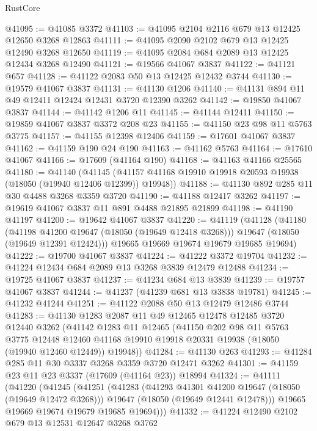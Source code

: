 \begin{lexlean}{RustCore}
\begin{coremodule}
@41095 := @41085 @3372
@41103 := @41095 @2104 @2116 @679 @13 @12425 @12650 @3268 @12863
@41111 := @41095 @2090 @2102 @679 @13 @12425 @12490 @3268 @12650
@41119 := @41095 @2084 @684 @2089 @13 @12425 @12434 @3268 @12490
@41121 := @19566 @41067 @3837
@41122 := @41121 @657
@41128 := @41122 @2083 @50 @13 @12425 @12432 @3744
@41130 := @19579 @41067 @3837
@41131 := @41130 @1206
@41140 := @41131 @894 @11 @49 @12411 @12424 @12431 @3720 @12390 @3262
@41142 := @19850 @41067 @3837
@41144 := @41142 @1206 @11
@41145 := @41144 @12411
@41150 := @19859 @41067 @3837 @3372 @208 @23
@41155 := @41150 @23 @98 @11 @5763 @3775
@41157 := @41155 @12398 @12406
@41159 := @17601 @41067 @3837
@41162 := @41159 @190 @24 @190
@41163 := @41162 @5763
@41164 := @17610 @41067
@41166 := @17609 (@41164 @190)
@41168 := @41163 @41166 @25565
@41180 := @41140
    (@41145 (@41157 @41168 @19910 @19918 @20593 @19938 (@18050 (@19940 @12406 @12399)) @19948))
@41188 := @41130 @892 @285 @11 @30 @4488 @3268 @3359 @3720
@41190 := @41188 @12417 @3262
@41197 := @19619 @41067 @3837 @11 @891 @4488 @21895 @21899
@41198 := @41190 @41197
@41200 := @19642 @41067 @3837
@41220 := @41119
    (@41128
      (@41180
        (@41198 @41200 @19647 (@18050 (@19649 @12418 @3268)))
        @19647
        (@18050 (@19649 @12391 @12424)))
      @19665
      @19669
      @19674
      @19679
      @19685
      @19694)
@41222 := @19700 @41067 @3837
@41224 := @41222 @3372 @19704
@41232 := @41224 @12434 @684 @2089 @13 @3268 @3839 @12479 @12488
@41234 := @19725 @41067 @3837
@41237 := @41234 @684 @13 @3839
@41239 := @19757 @41067 @3837
@41244 := @41237 (@41239 @681 @13 @3838 @19781)
@41245 := @41232 @41244
@41251 := @41122 @2088 @50 @13 @12479 @12486 @3744
@41283 := @41130
    @1283
    @2087
    @11
    @49
    @12465
    @12478
    @12485
    @3720
    @12440
    @3262
    (@41142
      @1283
      @11
      @12465
      (@41150
        @202
        @98
        @11
        @5763
        @3775
        @12448
        @12460
        @41168
        @19910
        @19918
        @20331
        @19938
        (@18050 (@19940 @12460 @12449))
        @19948))
@41284 := @41130 @263
@41293 := @41284 @285 @11 @30 @3337 @3268 @3359 @3720 @12471 @3262
@41301 := @41159 @23 @11 @23 @3337 (@17609 (@41164 @23)) @18994
@41324 := @41111
    (@41220
      (@41245
        (@41251
          (@41283
            (@41293 @41301 @41200 @19647 (@18050 (@19649 @12472 @3268)))
            @19647
            (@18050 (@19649 @12441 @12478)))
          @19665
          @19669
          @19674
          @19679
          @19685
          @19694)))
@41332 := @41224 @12490 @2102 @679 @13 @12531 @12647 @3268 @3762

\end{coremodule}
\end{lexlean}
